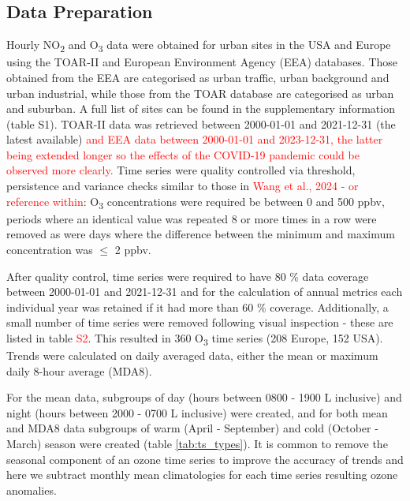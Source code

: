 \documentclass[journal abbreviation, manuscript]{copernicus}
\begin{document}
\subsection{Data Preparation} \label{sect:data_prep}
Hourly NO\textsubscript{2} and O\textsubscript{3} data were obtained for urban sites in the USA and Europe using the TOAR-II \citep{toar_db} and European Environment Agency (EEA) \citep{eea_1, eea_2} databases. Those obtained from the EEA are categorised as urban traffic, urban background and urban industrial, while those from the TOAR database are categorised as urban and suburban. A full list of sites can be found in the supplementary information (table S1).  TOAR-II data was retrieved between 2000-01-01 and 2021-12-31 (the latest available) \textcolor{red}{and EEA data between 2000-01-01 and 2023-12-31, the latter being extended longer so the effects of the COVID-19 pandemic could be observed more clearly.} Time series were quality controlled via threshold, persistence and variance checks similar to those in \textcolor{red}{Wang et al., 2024 - or reference within}: O\textsubscript{3} concentrations were required be between 0 and 500 ppbv, periods where an identical value was repeated 8 or more times in a row were removed as were days where the difference between the minimum and maximum concentration was $\leq$ 2 ppbv. 

After quality control, time series were required to have 80 \% data coverage between 2000-01-01 and 2021-12-31 and for the calculation of annual metrics each individual year was retained if it had more than 60 \% coverage. Additionally, a small number of time series were removed following visual inspection - these are listed in table \textcolor{red}{S2}. This resulted in 360 O\textsubscript{3} time series (208 Europe, 152 USA). Trends were calculated on daily averaged data, either the mean or maximum daily 8-hour average (MDA8). 

For the mean data, subgroups of day (hours between 0800 - 1900 L inclusive) and night (hours between 2000 - 0700 L inclusive) were created, and for both mean and MDA8 data subgroups of warm (April - September) and cold (October - March) season were created (table \ref{tab:ts_types}). It is common to remove the seasonal component of an ozone time series to improve the accuracy of trends \citep{cooper_2020} and here we subtract monthly mean climatologies for each time series resulting ozone anomalies. 
\end{document}
